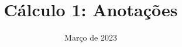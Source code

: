 \documentclass[a4paper]{report}
\title{Cálculo 1: Anotações}
\date{Março de 2023}
\begin{document}
\maketitle
\tableofcontents
\pagebreak


\end{document}

